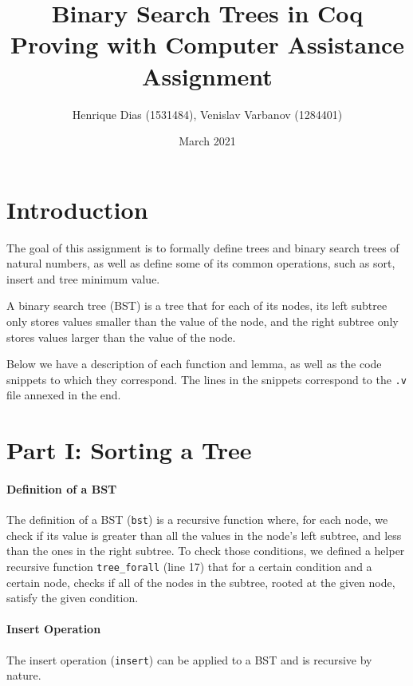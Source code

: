 \documentclass[a4paper]{article}
\title{%
  Binary Search Trees in Coq \\
  \large Proving with Computer Assistance Assignment}
\author{Henrique Dias (1531484), Venislav Varbanov (1284401)}
\date{March 2021}
\begin{document}
\maketitle

\section{Introduction}

The goal of this assignment is to formally define trees and binary search trees of natural numbers, as well as define some of its common operations, such as sort, insert and tree minimum value.

A binary search tree (BST) is a tree that for each of its nodes, its left subtree only stores values smaller than the value of the node, and the right subtree only stores values larger than the value of the node.

Below we have a description of each function and lemma, as well as the code snippets to which they correspond. The lines in the snippets correspond to the \texttt{.v} file annexed in the end.

\section{Part I: Sorting a Tree}

\paragraph{Definition of a BST}

The definition of a BST (\texttt{bst}) is a recursive function where, for each node, we check if its value is greater than all the values in the node's left subtree, and less than the ones in the right subtree. To check those conditions, we defined a helper recursive function \texttt{tree\_forall} (line 17) that for a certain condition and a certain node, checks if all of the nodes in the subtree, rooted at the given node, satisfy the given condition.



\paragraph{Insert Operation}

The insert operation (\texttt{insert}) can be applied to a BST and is recursive by nature.


\end{document}
